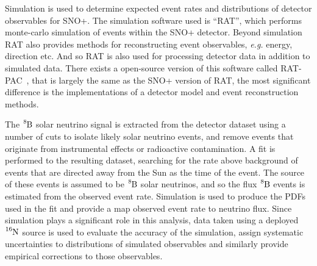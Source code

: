 Simulation is used to determine expected event rates and distributions of
detector observables for SNO+.
The simulation software used is ``RAT'', which performs monte-carlo
simulation of events within the SNO+ detector.
Beyond simulation RAT also provides methods for reconstructing event
observables, \textit{e.g.} energy, direction etc.
And so RAT is also used for processing detector data in addition
to simulated data.
There exists a open-source version of this software called
RAT-PAC~\cite{ratpac}, that is largely the same as the SNO+ version of RAT,
the most significant difference is the implementations of a detector model
and event reconstruction methods.

The $\ce{^{8}B}$ solar neutrino signal is extracted from the detector dataset
using a number of cuts to isolate likely solar neutrino events, and remove
events that originate from instrumental effects or radioactive contamination.
A fit is performed to the resulting dataset, searching for the rate above background of events
that are directed away from the Sun as the time of the event.
The source of these events is assumed to be $\ce{^{8}B}$ solar neutrinos, and
so the flux $\ce{^{8}B}$ events is estimated from the observed event rate.
Simulation is used to produce the PDFs used in the fit and provide a map observed
event rate to neutrino flux.
Since simulation plays a significant role in this analysis, data taken using
a deployed $\ce{^{16}N}$ source is used to evaluate the accuracy of the
simulation, assign systematic uncertainties to distributions of simulated observables
and similarly provide empirical corrections to those observables.








